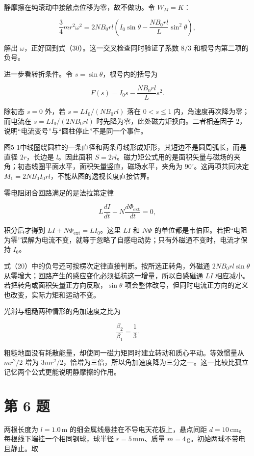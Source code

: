 \documentclass[12pt,a4paper,UTF8]{ctexart}
\begin{document}
静摩擦在纯滚动中接触点位移为零，故不做功。令 \(W_M=K\)：

\[
\frac34mr^2\omega^2
=2NB_0rl
\left(I_0\sin\theta-\frac{NB_0rl}{L}\sin^2\theta\right), \tag{38}
\]

解出 \(\omega\)，正好回到式（30）。这一交叉检查同时验证了系数 \(8/3\)
和根号内第二项的负号。

进一步看转折条件。令 \(s=\sin\theta\)，根号内的括号为

\[
F(s)=I_0s-\frac{NB_0rl}{L}s^2. \tag{39}
\]

除初态 \(s=0\) 外，若 \(s=LI_0/(NB_0rl)\) 落在 \(0<s\leqslant1\)
内，角速度再次降为零；而电流在 \(s=LI_0/(2NB_0rl)\)
时先降为零，此处磁力矩换向。二者相差因子
\(2\)，说明``电流变号''与``圆柱停止''不是同一个事件。

图5-1中线圈绕圆柱的一条直径和两条母线形成矩形，其短边不是圆周弧长，而是直径
\(2r\)，长边是 \(l\)。因此面积
\(S=2rl\)。磁力矩公式用的是面积矢量与磁场的夹角；初态线圈平面水平，面积矢量竖直，磁场水平，夹角为
\(90^\circ\)。这两项共同决定
\(M_1=2NB_0I_0rl\)，不能从图的透视长度直接估算。

零电阻闭合回路满足的是法拉第定律

\[
L\frac{dI}{dt}+N\frac{d\Phi_{\mathrm{ext}}}{dt}=0,
\]

积分后才得到 \(LI+N\Phi_{\mathrm{ext}}=LI_0\)。这里 \(LI\) 和 \(N\Phi\)
的单位都是韦伯匝。若把``电阻为零''误解为电流不变，就等于忽略了自感电动势；只有外磁通不变时，电流才保持
\(I_0\)。

式（20）中的负号还可按楞次定律直接判断。按所选正转角，外磁通
\(2NB_0rl\sin\theta\)
从零增大；回路产生的感应变化必须抵抗这一增量，所以自感磁通 \(LI\)
相应减小。若把转角或面积矢量正方向反取，\(\sin\theta\)
项会整体改号，但同时电流正方向的定义也改变，实际力矩和运动不变。

光滑与粗糙两种情形的角加速度之比为

\[
\frac{\beta_2}{\beta_1}=\frac13.
\]

粗糙地面没有耗散能量，却使同一磁力矩同时建立转动和质心平动。等效惯量从
\(mr^2/2\) 增为
\(3mr^2/2\)，恰增为三倍，所以角加速度降为三分之一。这一比较比孤立记忆两个公式更能说明静摩擦的作用。

\newpage

\section{第 6 题}\label{ux7b2c-6-ux9898}

两根长度为 \(l=1.0\,\mathrm m\) 的细金属线悬挂在不导电天花板上，悬点间距
\(d=10\,\mathrm{cm}\)。每根线下端挂一个相同钢球，球半径
\(r=5\,\mathrm{mm}\)、质量 \(m=4\,\mathrm g\)。初始两球不带电且静止。取
\end{document}
